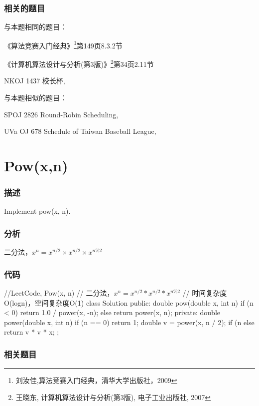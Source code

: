 \subsubsection{相关的题目}
与本题相同的题目：
\begindot
\item 《算法竞赛入门经典》\footnote{刘汝佳,算法竞赛入门经典，清华大学出版社，2009}第149页8.3.2节
\item 《计算机算法设计与分析(第3版)》\footnote{王晓东, 计算机算法设计与分析(第3版), 电子工业出版社, 2007}第34页2.11节
\item NKOJ 1437 校长杯, 
\myenddot

与本题相似的题目：
\begindot
\item SPOJ 2826 Round-Robin Scheduling, 
\item UVa OJ 678 Schedule of Taiwan Baseball League, 
\myenddot


\section{Pow(x,n)} %
\label{sec:pow}


\subsubsection{描述}
Implement pow(x, n).


\subsubsection{分析}
二分法，$x^n = x^{n/2} \times x^{n/2} \times x^{n\%2}$


\subsubsection{代码}
\begin{Code}
	//LeetCode, Pow(x, n)
	// 二分法，$x^n = x^{n/2} * x^{n/2} * x^{n\%2}$
	// 时间复杂度O(logn)，空间复杂度O(1)
	class Solution {
		public:
		double pow(double x, int n) {
			if (n < 0) return 1.0 / power(x, -n);
			else return power(x, n);
		}
		private:
		double power(double x, int n) {
			if (n == 0) return 1;
			double v = power(x, n / 2);
			if (n %
			else return v * v * x;
		}
	};
\end{Code}


\subsubsection{相关题目}

